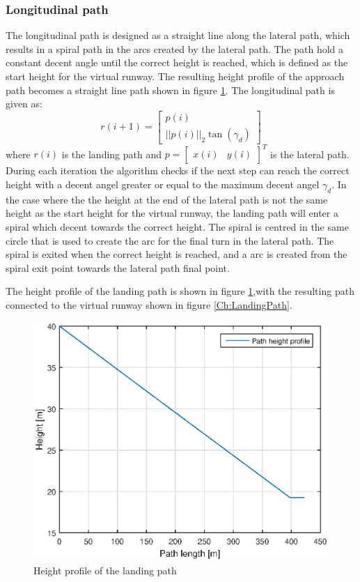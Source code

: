 \subsubsection{Longitudinal path}
The longitudinal path is designed as a straight line along the lateral path, which results in a spiral path in the arcs created by the lateral path. The path hold a constant decent angle until the correct height is reached, which is defined as the start height for the virtual runway. The resulting height profile of the approach path becomes a straight line path shown in figure \ref{Fig:HeightProfile}. The longitudinal path is given as:
\begin{equation}
r(i+1) = \begin{bmatrix}
p(i) \\
||p(i)||_2\tan(\gamma_d)
\end{bmatrix}
\end{equation}
where $r(i)$ is the landing path and 
$p = \begin{bmatrix}
x(i) & y(i)
\end{bmatrix}^T$ is the lateral path. During each iteration the algorithm checks if the next step can reach the correct height with a decent angel greater or equal to the maximum decent angel $\gamma_d$. In the case where the the height at the end of the lateral path is not the same height as the start height for the virtual runway, the landing path will enter a spiral which decent towards the correct height. The spiral is centred in the same circle that is used to create the arc for the final turn in the lateral path. The spiral is exited when the correct height is reached, and a arc is created from the spiral exit point towards the lateral path final point.

The height profile of the landing path is shown in figure \ref{Fig:HeightProfile},with the resulting path connected to the virtual runway shown in figure \ref{Ch:LandingPath}.

\begin{figure}[H]
	\centering
		\includegraphics[width=1\textwidth]{figs/SysPlot/heightProfile.eps}
		\caption{Height profile of the landing path}
		\label{Fig:HeightProfile}
\end{figure}

